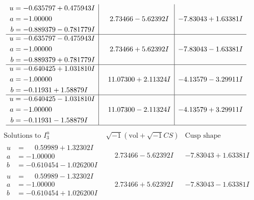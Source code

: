 \documentclass[1p]{elsarticle_modified}
\theoremstyle{definition}
\newcommand{\I}{\sqrt{-1}}
\begin{document}
$$\begin{array}{c|c|c}
\begin{aligned}
u &= -0.635797 + 0.475943 I \\
a &= -1.00000\phantom{ +0.000000I} \\
b &= -0.889379 - 0.781779 I\end{aligned}
 & \phantom{-}2.73466 - 5.62392 I & -7.83043 + 1.63381 I \\ \hline\begin{aligned}
u &= -0.635797 - 0.475943 I \\
a &= -1.00000\phantom{ +0.000000I} \\
b &= -0.889379 + 0.781779 I\end{aligned}
 & \phantom{-}2.73466 + 5.62392 I & -7.83043 - 1.63381 I \\ \hline\begin{aligned}
u &= -0.640425 + 1.031810 I \\
a &= -1.00000\phantom{ +0.000000I} \\
b &= -0.11931 + 1.58879 I\end{aligned}
 & \phantom{-}11.07300 + 2.11324 I & -4.13579 - 3.29911 I \\ \hline\begin{aligned}
u &= -0.640425 - 1.031810 I \\
a &= -1.00000\phantom{ +0.000000I} \\
b &= -0.11931 - 1.58879 I\end{aligned}
 & \phantom{-}11.07300 - 2.11324 I & -4.13579 + 3.29911 I\\
 \hline 
 \end{array}$$\newpage$$\begin{array}{c|c|c}  
\text{Solutions to }I^u_{3}& \I (\text{vol} + \sqrt{-1}CS) & \text{Cusp shape}\\
 \hline 
\begin{aligned}
u &= \phantom{-}0.59989 + 1.32302 I \\
a &= -1.00000\phantom{ +0.000000I} \\
b &= -0.610454 - 1.026200 I\end{aligned}
 & \phantom{-}2.73466 - 5.62392 I & -7.83043 + 1.63381 I \\ \hline\begin{aligned}
u &= \phantom{-}0.59989 - 1.32302 I \\
a &= -1.00000\phantom{ +0.000000I} \\
b &= -0.610454 + 1.026200 I\end{aligned}
 & \phantom{-}2.73466 + 5.62392 I & -7.83043 - 1.63381 I \\ \hline\begin{aligned}

\end{aligned}
\end{array}$$
\end{document}

